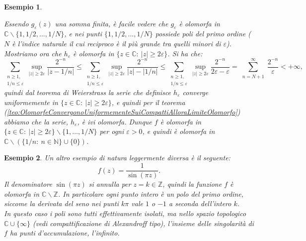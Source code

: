 \documentclass[11pt]{book}
\theoremstyle{Definizione}
\theoremstyle{TeoremaProposizioneLemmaCorollarioCongettura}
\theoremstyle{OsservazioneNotaEsempio}
\newtheorem{myes}{Esempio}[section]
\newcommand{\N}{\mathbb{N}}
\newcommand{\Z}{\mathbb{Z}}
\newcommand{\C}{\mathbb{C}}
\newcommand{\tolto}{\smallsetminus}
\begin{document}
\begin{myes}
\begin{center}
\end{center}
Essendo $g_\varepsilon(z)$ una somma finita, è facile vedere che $g_\varepsilon$ è olomorfa in $\C \tolto \{1,1/2,\dots,1/N\}$, e nei punti $\{1,1/2,\dots,1/N\}$ possiede poli del primo ordine ($N$ è l'indice naturale il cui reciproco è il più grande tra quelli minori di $\varepsilon$).\\
Mostriamo ora che $h_\varepsilon$ è olomorfa in $\{z\in \C:\ |z| \geq 2\varepsilon\}$. Si ha che:
$$
\sum_{\substack{n \geq 1,\\ 1/n \leq \varepsilon}} \sup_{|z| \geq 2\varepsilon}\frac{2^{-n}}{|z-1/n|} \leq \sum_{\substack{n \geq 1,\\ 1/n \leq \varepsilon}} \sup_{|z| \geq 2\varepsilon}\frac{2^{-n}}{|z|-|1/n|} \leq \sum_{\substack{n \geq 1,\\ 1/n \leq \varepsilon}} \sup_{|z| \geq 2\varepsilon}\frac{2^{-n}}{2\varepsilon-\varepsilon} = \sum_{\substack{n = N+1}}^\infty \frac{2^{-n}}{\varepsilon} < +\infty, 
$$
quindi dal teorema di Weierstrass la serie che definisce $h_\varepsilon$ converge uniformemente in $\{z\in \C:\ |z| \geq 2\varepsilon\}$, e quindi per il teorema (\ref{teo:OlomorfeConvergonoUniformementeSuiCompattiAlloraLimiteOlomorfo}) abbiamo che la serie, $h_\varepsilon$, è ivi olomorfa. Dunque $f$ è olomorfa in $\{z\in \C:\ |z| \geq 2\varepsilon\}\tolto \{1,\dots,1/N\}$ per ogni $\varepsilon > 0$, e quindi è olomorfa in $\C \tolto (\{1/n:\ n\in \N\}\cup \{0\})$.
\end{myes}
\begin{myes}
Un altro esempio di natura leggermente diversa è il seguente:
$$
f(z) = \frac{1}{\sin(\pi z)}.
$$
Il denominatore $\sin(\pi z)$ si annulla per $z = k\in \Z$, quindi la funzione $f$ è olomorfa in $\C \tolto \Z$. In particolare ogni punto intero è un polo del primo ordine, siccome la derivata del seno nei punti $k\pi$ vale $1$ o $-1$ a seconda dell'intero $k$.\\
In questo caso i poli sono tutti effettivamente isolati, ma nello spazio topologico $\C \cup \{\infty\}$ (vedi compattificazione di Alexandroff tipo), l'insieme delle singolarità di $f$ ha punti d'accumulazione, l'infinito.
\end{myes}
\end{document}
